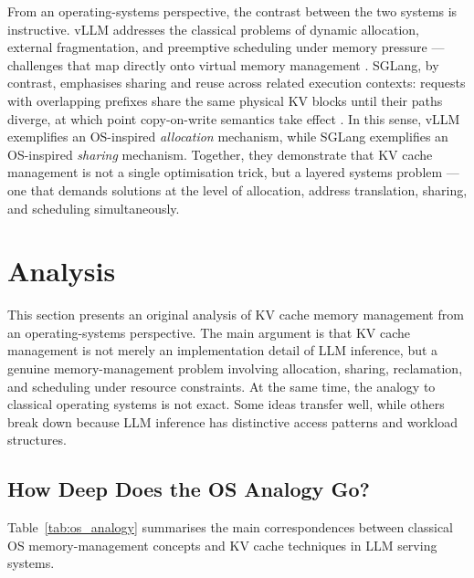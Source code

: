 \documentclass[10pt, a4paper]{article}
\begin{document}
From an operating-systems perspective, the contrast between the two
systems is instructive.
vLLM addresses the classical problems of dynamic allocation, external
fragmentation, and preemptive scheduling under memory pressure ---
challenges that map directly onto virtual memory management
\cite{silberschatz2018os}.
SGLang, by contrast, emphasises sharing and reuse across related
execution contexts: requests with overlapping prefixes share the same
physical KV blocks until their paths diverge, at which point
copy-on-write semantics take effect \cite{zheng2024sglang}.
In this sense, vLLM exemplifies an OS-inspired \emph{allocation}
mechanism, while SGLang exemplifies an OS-inspired \emph{sharing}
mechanism.
Together, they demonstrate that KV cache management is not a single
optimisation trick, but a layered systems problem --- one that demands
solutions at the level of allocation, address translation, sharing, and
scheduling simultaneously.
\section{Analysis}
\label{sec:analysis}

This section presents an original analysis of KV cache memory
management from an operating-systems perspective. The main argument is
that KV cache management is not merely an implementation detail of LLM
inference, but a genuine memory-management problem involving
allocation, sharing, reclamation, and scheduling under resource
constraints. At the same time, the analogy to classical operating
systems is not exact. Some ideas transfer well, while others break down
because LLM inference has distinctive access patterns and workload
structures.

\subsection{How Deep Does the OS Analogy Go?}

Table~\ref{tab:os_analogy} summarises the main correspondences between
classical OS memory-management concepts and KV cache techniques in LLM
serving systems.\cite{silberschatz2018os,tanenbaum2015modern}
\end{document}
